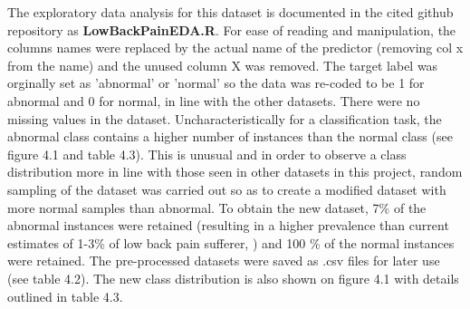 The exploratory data analysis for this dataset is documented in the cited github repository as \textbf{LowBackPainEDA.R}.\newline
For ease of reading and  manipulation, the columns names were replaced by the actual name of the predictor (removing col x from the name) and the unused column X was removed.\newline
The target label was orginally set as 'abnormal' or 'normal' so the data was re-coded to be 1 for abnormal and 0 for normal, in line with the other datasets. There were no missing values in the dataset.\newline
Uncharacteristically for a classification task, the abnormal class contains a higher number of instances than the normal class (see figure 4.1 and table 4.3). This is unusual and in order to observe a class distribution more in line with those seen in other datasets in this project, random sampling of the dataset was  carried out so as to create a modified dataset with more normal samples than abnormal. \newline
To obtain the new dataset, 7\% of the abnormal instances were  retained (resulting in a higher prevalence than current estimates of 1-3\% of low back pain sufferer, \citep{Jordan:2009vx}) and 100 \% of the normal instances were retained. The pre-processed datasets were saved as .csv files for later use (see table 4.2). The new class distribution is also shown on figure 4.1 with details outlined in table 4.3.\newline

